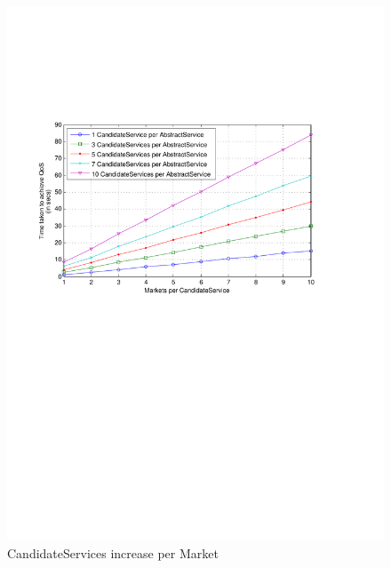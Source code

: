\documentclass[10pt,journal,compsoc]{IEEEtran}
\begin{document}
\begin{figure}[htbp]
		\begin{minipage}{0.4\linewidth}
			\includegraphics[clip, trim=4cm 14cm 6cm 6cm, scale=0.3]{graphs/1_3_5_7_10_svc_per_mkt_scaling.pdf}
			\caption{CandidateServices increase per Market\label{fig:svc_per_mkt}}		
		\end{minipage}
		\hspace{0.9cm}
		\begin{minipage}{0.4\linewidth}

\end{minipage}
\end{figure}
\end{document}
